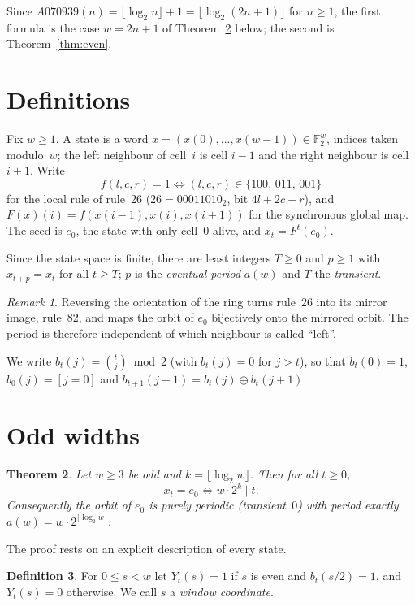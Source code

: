 \documentclass[11pt]{article}
\newtheorem{theorem}{Theorem}
\theoremstyle{definition}
\newtheorem{definition}[theorem]{Definition}
\theoremstyle{remark}
\newtheorem{remark}[theorem]{Remark}
\newcommand{\F}{\mathbb{F}}
\begin{document}
Since $A070939(n) = \lfloor \log_2 n \rfloor + 1 = \lfloor \log_2 (2n+1) \rfloor$
for $n \ge 1$, the first formula is the case $w = 2n+1$ of
Theorem~\ref{thm:odd} below; the second is Theorem~\ref{thm:even}.

\section{Definitions}

Fix $w \ge 1$. A state is a word $x = (x(0), \dots, x(w-1)) \in \F_2^{w}$,
indices taken modulo~$w$; the left neighbour of cell~$i$ is cell $i-1$ and the
right neighbour is cell $i+1$. Write
\[
f(l,c,r) = 1 \iff (l,c,r) \in \{100,\,011,\,001\}
\]
for the local rule of rule~26 ($26 = 00011010_2$, bit $4l+2c+r$), and
$F(x)(i) = f(x(i-1), x(i), x(i+1))$ for the synchronous global map. The seed
is $e_0$, the state with only cell~$0$ alive, and $x_t = F^t(e_0)$.

Since the state space is finite, there are least integers $T \ge 0$ and
$p \ge 1$ with $x_{t+p} = x_t$ for all $t \ge T$; $p$ is the \emph{eventual
period} $a(w)$ and $T$ the \emph{transient}.

\begin{remark}
Reversing the orientation of the ring turns rule~26 into its mirror image,
rule~82, and maps the orbit of $e_0$ bijectively onto the mirrored orbit. The
period is therefore independent of which neighbour is called ``left''.
\end{remark}

We write $b_t(j) = \binom{t}{j} \bmod 2$ (with $b_t(j) = 0$ for $j > t$), so
that $b_t(0) = 1$, $b_0(j) = [j = 0]$ and
$b_{t+1}(j+1) = b_t(j) \oplus b_t(j+1)$.

\section{Odd widths}

\begin{theorem}\label{thm:odd}
Let $w \ge 3$ be odd and $k = \lfloor \log_2 w \rfloor$. Then for all $t \ge 0$,
\[
x_t = e_0 \iff w \cdot 2^{k} \mid t .
\]
Consequently the orbit of $e_0$ is purely periodic (transient~$0$) with
period exactly $a(w) = w \cdot 2^{\lfloor \log_2 w \rfloor}$.
\end{theorem}

The proof rests on an explicit description of every state.

\begin{definition}
For $0 \le s < w$ let $Y_t(s) = 1$ if $s$ is even and $b_t(s/2) = 1$, and
$Y_t(s) = 0$ otherwise. We call $s$ a \emph{window coordinate}.
\end{definition}
\end{document}

